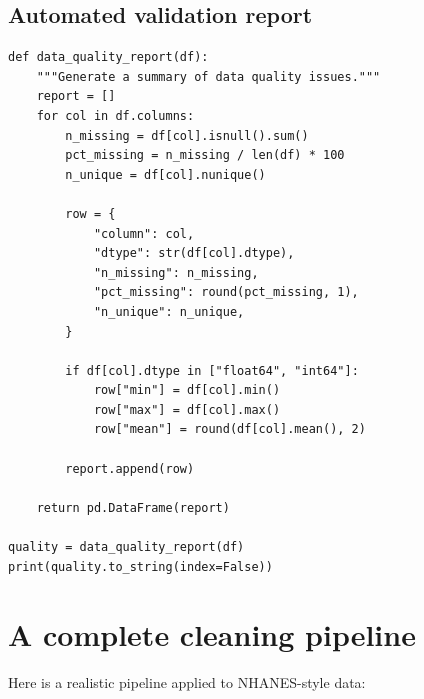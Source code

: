 \subsection{Automated validation report}

\begin{verbatim}
def data_quality_report(df):
    """Generate a summary of data quality issues."""
    report = []
    for col in df.columns:
        n_missing = df[col].isnull().sum()
        pct_missing = n_missing / len(df) * 100
        n_unique = df[col].nunique()

        row = {
            "column": col,
            "dtype": str(df[col].dtype),
            "n_missing": n_missing,
            "pct_missing": round(pct_missing, 1),
            "n_unique": n_unique,
        }

        if df[col].dtype in ["float64", "int64"]:
            row["min"] = df[col].min()
            row["max"] = df[col].max()
            row["mean"] = round(df[col].mean(), 2)

        report.append(row)

    return pd.DataFrame(report)

quality = data_quality_report(df)
print(quality.to_string(index=False))
\end{verbatim}

\section{A complete cleaning pipeline}

Here is a realistic pipeline applied to NHANES-style data:

